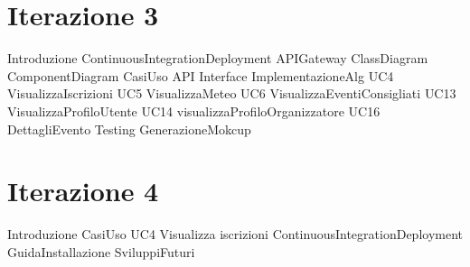 \documentclass[a4paper, 12pt]{book}
\begin{document}
\chapter{Iterazione 3}
{Introduzione}
\clearpage
{ContinuousIntegrationDeployment}
\clearpage
{APIGateway}
\clearpage
{ClassDiagram}
\clearpage
{ComponentDiagram}
\clearpage
{CasiUso}
\clearpage
{API}
\clearpage
{Interface}
\clearpage
{ImplementazioneAlg}
\clearpage
{UC4 VisualizzaIscrizioni}
\clearpage
{UC5 VisualizzaMeteo}
\clearpage
{UC6 VisualizzaEventiConsigliati}
\clearpage
{UC13 VisualizzaProfiloUtente}
\clearpage
{UC14 visualizzaProfiloOrganizzatore}
\clearpage
{UC16 DettagliEvento}
\clearpage
{Testing}
\clearpage
{GenerazioneMokcup}
\clearpage 


\chapter{Iterazione 4}
{Introduzione}
\clearpage
{CasiUso}
\clearpage
{UC4 Visualizza iscrizioni}
\clearpage
{ContinuousIntegrationDeployment}
\clearpage
{GuidaInstallazione}
\clearpage
{SviluppiFuturi}
\clearpage
\end{document}
